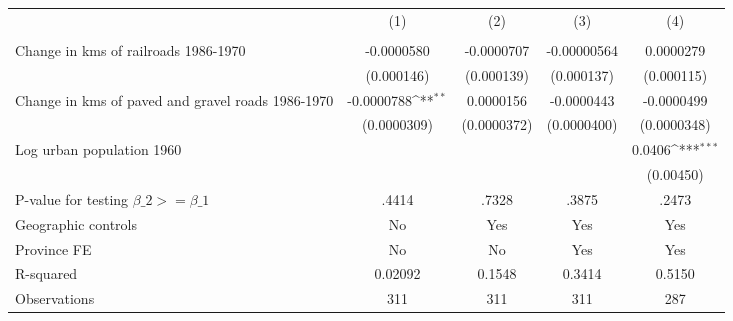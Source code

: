 {
\def\sym#1{\ifmmode^{#1}\else\(^{#1}\)\fi}
\begin{tabular}{l*{4}{c}}
\hline\hline
                &\multicolumn{1}{c}{(1)}&\multicolumn{1}{c}{(2)}&\multicolumn{1}{c}{(3)}&\multicolumn{1}{c}{(4)}\\
                &\multicolumn{1}{c}{}&\multicolumn{1}{c}{}&\multicolumn{1}{c}{}&\multicolumn{1}{c}{}\\
\hline
Change in kms of railroads 1986-1970&-0.0000580         &-0.0000707         &-0.00000564         &0.0000279         \\
                &(0.000146)         &(0.000139)         &(0.000137)         &(0.000115)         \\
[1em]
Change in kms of paved and gravel roads 1986-1970&-0.0000788\sym{**} &0.0000156         &-0.0000443         &-0.0000499         \\
                &(0.0000309)         &(0.0000372)         &(0.0000400)         &(0.0000348)         \\
[1em]
Log urban population 1960&                  &                  &                  &   0.0406\sym{***}\\
                &                  &                  &                  &(0.00450)         \\
\hline
P-value for testing $\beta\_{2} >= \beta\_{1}$&    .4414         &    .7328         &    .3875         &    .2473         \\
Geographic controls&       No         &      Yes         &      Yes         &      Yes         \\
Province FE     &       No         &       No         &      Yes         &      Yes         \\
R-squared       &  0.02092         &   0.1548         &   0.3414         &   0.5150         \\
Observations    &      311         &      311         &      311         &      287         \\
\hline\hline
\end{tabular}
}
